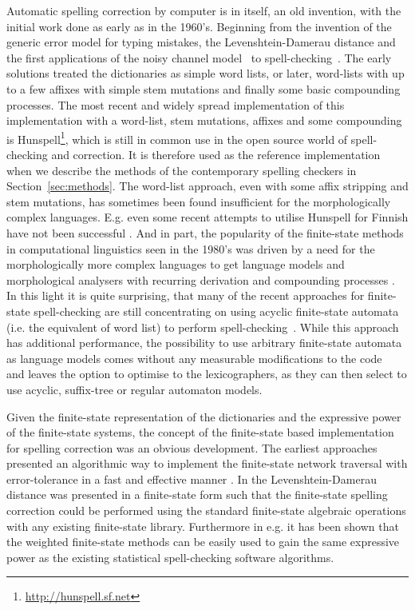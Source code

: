 \documentclass[a4paper,12pt]{article}
\begin{document}
Automatic spelling correction by computer is in itself, an old invention, with
the initial work done as early as in the 1960's. Beginning from the invention
of the generic error model for typing mistakes, the Levenshtein-Damerau
distance \cite[]{levenshtein/1966,damerau/1964} and the first applications of
the noisy channel model~\cite[]{shannon/1948} to
spell-checking~\cite[]{raviv/1967}.  The early solutions treated the
dictionaries as simple word lists, or later, word-lists with up to a few
affixes with simple stem mutations and finally some basic compounding
processes. The most recent and widely spread implementation of this
implementation with a word-list, stem mutations, affixes and some compounding
is Hunspell\footnote{\url{http://hunspell.sf.net}}, which is still in common
use in the open source world of spell-checking and correction.  It is therefore
used as the reference implementation when we describe the methods of the
contemporary spelling checkers in Section~\ref{sec:methods}. The word-list
approach, even with some affix stripping and stem mutations, has sometimes been
found insufficient for the morphologically complex languages.  E.g. even some
recent attempts to utilise Hunspell for Finnish have not been successful
\cite[]{pitkanen/2006}. And in part, the popularity of the finite-state methods
in computational linguistics seen in the 1980's was driven by a need for the
morphologically more complex languages to get language models and morphological
analysers with recurring derivation and compounding processes
\cite[]{beesley2004morphological}.  In this light it is quite surprising, that
many of the recent approaches for finite-state spell-checking are still
concentrating on using acyclic finite-state automata (i.e. the equivalent of
word list) to perform
spell-checking~\cite[]{watson2003new,deorowicz2005correcting}. While this
approach has additional performance, the possibility to use arbitrary
finite-state automata as language models comes without any measurable
modifications to the code~\cite[e.g.][]{pirinen/2010/lrec} and leaves the
option to optimise to the lexicographers, as they can then select to use
acyclic, suffix-tree or regular automaton models.

Given the  finite-state representation of the dictionaries and the expressive
power of the finite-state systems, the concept of the finite-state based
implementation for spelling correction was an obvious development. The
earliest approaches presented an algorithmic way to implement the finite-state
network traversal with error-tolerance \cite[]{oflazer/1996} in a fast and
effective manner \cite[]{agata/2002,hulden/2009}.  In \cite{schulz/2002} the
Levenshtein-Damerau distance was presented in a finite-state form such that the
finite-state spelling correction could be performed using the standard
finite-state algebraic operations with any existing finite-state library.
Furthermore in e.g.  \cite{pirinen/2010/lrec} it has been shown that the
weighted finite-state methods can be easily used to gain the same expressive
power as the existing statistical spell-checking software algorithms.
\end{document}
